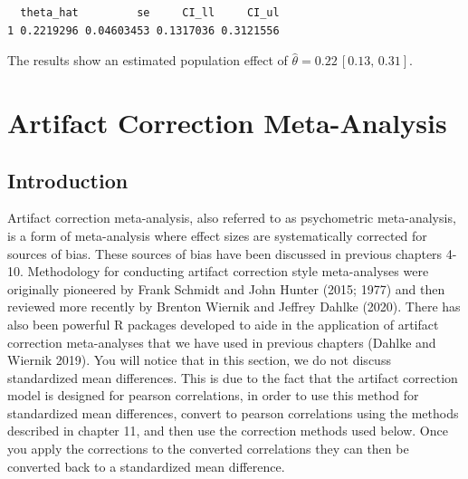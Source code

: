 \documentclass[
  letterpaper,
  DIV=11,
  numbers=noendperiod]{scrreprt}
\newenvironment{Shaded}{}{}
\newcommand{\AttributeTok}[1]{\textcolor[rgb]{0.00,0.34,0.68}{#1}}
\newcommand{\CommentTok}[1]{\textcolor[rgb]{0.54,0.53,0.53}{#1}}
\newcommand{\DecValTok}[1]{\textcolor[rgb]{0.69,0.50,0.00}{#1}}
\newcommand{\FunctionTok}[1]{\textcolor[rgb]{0.39,0.29,0.61}{#1}}
\newcommand{\NormalTok}[1]{\textcolor[rgb]{0.12,0.11,0.11}{#1}}
\newcommand{\SpecialCharTok}[1]{\textcolor[rgb]{0.24,0.68,0.91}{#1}}
\begin{document}
\begin{tcolorbox}
\begin{Shaded}
\end{Shaded}

\begin{verbatim}
  theta_hat         se     CI_ll     CI_ul
1 0.2219296 0.04603453 0.1317036 0.3121556
\end{verbatim}

The results show an estimated population effect of
\(\hat{\theta}=0.22\, [0.13,\, 0.31]\).

\end{tcolorbox}

\hypertarget{sec-artifact}{%
\chapter{Artifact Correction Meta-Analysis}\label{sec-artifact}}

\hypertarget{introduction-8}{%
\section{Introduction}\label{introduction-8}}

Artifact correction meta-analysis, also referred to as psychometric
meta-analysis, is a form of meta-analysis where effect sizes are
systematically corrected for sources of bias. These sources of bias have
been discussed in previous chapters 4-10. Methodology for conducting
artifact correction style meta-analyses were originally pioneered by
Frank Schmidt and John Hunter (2015; 1977) and then reviewed more
recently by Brenton Wiernik and Jeffrey Dahlke (2020). There has also
been powerful R packages developed to aide in the application of
artifact correction meta-analyses that we have used in previous chapters
(Dahlke and Wiernik 2019). You will notice that in this section, we do
not discuss standardized mean differences. This is due to the fact that
the artifact correction model is designed for pearson correlations, in
order to use this method for standardized mean differences, convert to
pearson correlations using the methods described in chapter 11, and then
use the correction methods used below. Once you apply the corrections to
the converted correlations they can then be converted back to a
standardized mean difference.
\end{document}
